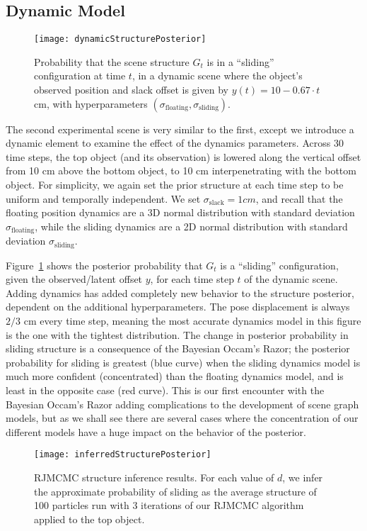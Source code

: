 \subsection{Dynamic Model}
\begin{figure}[H]
  \texttt{[image: dynamicStructurePosterior]}
  \caption{
    Probability that the scene structure $G_t$ is in a ``sliding'' configuration at time $t$, in a dynamic scene where the object's observed position and slack offset is given by $y(t) = 10 - 0.67\cdot t$ cm, with hyperparameters $(\sigma_\mathrm{floating}, \sigma_\mathrm{sliding})$.
  }
  \label{fig:dynamicStructurePosterior}
\end{figure}
The second experimental scene is very similar to the first, except we introduce a dynamic element to examine the effect of the dynamics parameters.
Across 30 time steps, the top object (and its observation) is lowered along the vertical offset from 10 cm above the bottom object, to 10 cm interpenetrating with the bottom object.
For simplicity, we again set the prior structure at each time step to be uniform and temporally independent.
We set $\sigma_\mathrm{slack} = 1 cm$, and recall that the floating position dynamics are a 3D normal distribution with standard deviation $\sigma_\mathrm{floating}$, while the sliding dynamics are a 2D normal distribution with standard deviation $\sigma_\mathrm{sliding}$.

Figure~\ref{fig:dynamicStructurePosterior} shows the posterior probability that $G_t$ is a ``sliding'' configuration, given the observed/latent offset $y$, for each time step $t$ of the dynamic scene.
Adding dynamics has added completely new behavior to the structure posterior, dependent on the additional hyperparameters.
The pose displacement is always $2/3$ cm every time step, meaning the most accurate dynamics model in this figure is the one with the tightest distribution.
The change in posterior probability in sliding structure is a consequence of the Bayesian Occam's Razor; the posterior probability for sliding is greatest (blue curve) when the sliding dynamics model is much more confident (concentrated) than the floating dynamics model, and is least in the opposite case (red curve).
This is our first encounter with the Bayesian Occam's Razor adding complications to the development of scene graph models, but as we shall see there are several cases where the concentration of our different models have a huge impact on the behavior of the posterior.

\begin{figure}[H]
  \texttt{[image: inferredStructurePosterior]}
  \caption{
    RJMCMC structure inference results.
    For each value of $d$, we infer the approximate probability of sliding as the average structure of 100 particles run with 3 iterations of our RJMCMC algorithm applied to the top object.
  }
  \label{fig:inferredStructurePosterior}
\end{figure}

